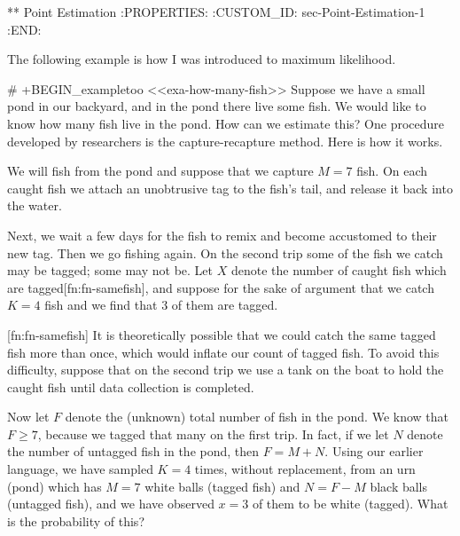 ** Point Estimation
:PROPERTIES:
:CUSTOM_ID: sec-Point-Estimation-1
:END:

The following example is how I was introduced to maximum likelihood.

# +BEGIN_exampletoo
<<exa-how-many-fish>> Suppose we have a small pond in our backyard,
and in the pond there live some fish. We would like to know how many
fish live in the pond. How can we estimate this? One procedure
developed by researchers is the capture-recapture method. Here is how
it works.

We will fish from the pond and suppose that we capture \(M=7\)
fish. On each caught fish we attach an unobtrusive tag to the fish's
tail, and release it back into the water.

Next, we wait a few days for the fish to remix and become accustomed
to their new tag. Then we go fishing again. On the second trip some of
the fish we catch may be tagged; some may not be. Let \(X\) denote the
number of caught fish which are tagged[fn:fn-samefish], and suppose
for the sake of argument that we catch \(K=4\) fish and we find that 3
of them are tagged.

[fn:fn-samefish] It is theoretically possible that we could catch the
same tagged fish more than once, which would inflate our count of
tagged fish. To avoid this difficulty, suppose that on the second trip
we use a tank on the boat to hold the caught fish until data
collection is completed.

Now let \(F\) denote the (unknown) total number of fish in the
pond. We know that \(F\geq7\), because we tagged that many on the
first trip. In fact, if we let \(N\) denote the number of untagged
fish in the pond, then \(F=M+N\). Using our earlier language, we have
sampled \(K=4\) times, without replacement, from an urn (pond) which
has \(M=7\) white balls (tagged fish) and \(N=F-M\) black balls
(untagged fish), and we have observed \(x=3\) of them to be white
(tagged). What is the probability of this?

